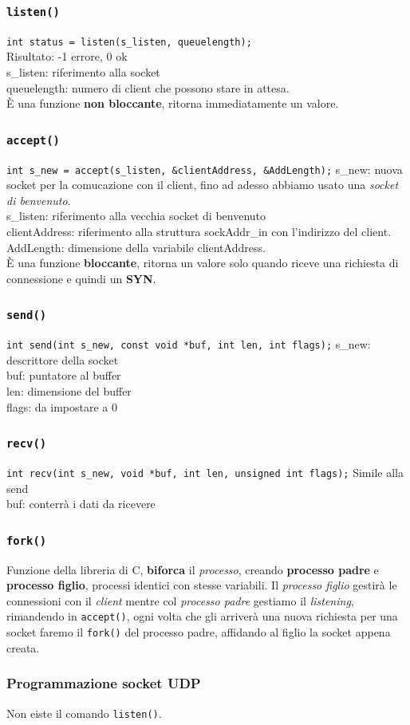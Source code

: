 \subsubsection*{\texttt{listen()}}
\texttt{int status = listen(s\_listen, queuelength);} \\ 
Risultato: -1 errore, 0 ok \\ 
s\_listen: riferimento alla socket \\ 
queuelength: numero di client che possono stare in attesa. \\ 
È una funzione \textbf{non bloccante}, ritorna immediatamente un valore. 

\subsubsection*{\texttt{accept()}}
\texttt{int s\_new = accept(s\_listen, \&clientAddress, \&AddLength);}
s\_new: nuova socket per la comucazione con il client, fino ad adesso abbiamo usato una \textit{socket di benvenuto}. \\ 
s\_listen: riferimento alla vecchia socket di benvenuto \\ 
clientAddress: riferimento alla struttura sockAddr\_in con l'indirizzo del client. \\ 
AddLength: dimensione della variabile clientAddress. \\ 
È una funzione \textbf{bloccante}, ritorna un valore solo quando riceve una richiesta di connessione e quindi un \textbf{SYN}.

\subsubsection*{\texttt{send()}}
\texttt{int send(int s\_new, const void *buf, int len, int flags);}
s\_new: descrittore della socket \\ 
buf: puntatore al buffer \\ 
len: dimensione del buffer \\ 
flags: da impostare a 0 

\subsubsection*{\texttt{recv()}}
\texttt{int recv(int s\_new, void *buf, int len, unsigned int flags);}
Simile alla send \\ 
buf: conterrà i dati da ricevere 

\subsubsection*{\texttt{fork()}}
Funzione della libreria di C, \textbf{biforca} il \textit{processo}, creando \textbf{processo padre} e \textbf{processo figlio}, processi identici con stesse variabili. Il \textit{processo figlio} gestirà le connessioni con il \textit{client} mentre col \textit{processo padre} gestiamo il \textit{listening}, rimandendo in \texttt{accept()}, ogni volta che gli arriverà una nuova richiesta per una socket faremo il \texttt{fork()} del processo padre, affidando al figlio la socket appena creata.

\subsubsection{Programmazione socket UDP}
Non eiste il comando \texttt{listen()}. 
